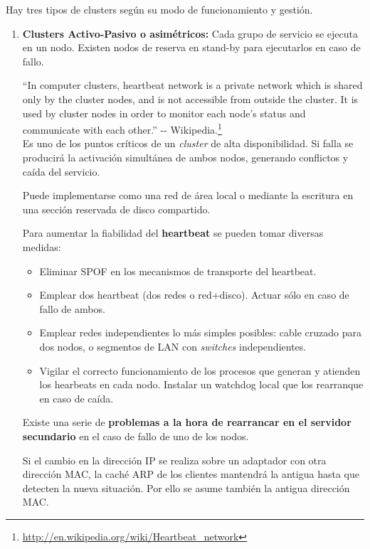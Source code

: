 Hay tres tipos de clusters según su modo de funcionamiento y gestión.
\begin{enumerate}
\item[1] \textbf{Clusters Activo-Pasivo o asimétricos:} Cada grupo de servicio se ejecuta en un nodo. Existen nodos de reserva en stand-by para ejecutarlos en caso de fallo.

\begin{defn}[Heartbeat]
``In computer clusters, heartbeat network is a private network which is shared only by the cluster nodes, and is not accessible from outside the cluster. It is used by cluster nodes in order to monitor each node's status and communicate with each other.'' -{}- Wikipedia.\footnote{\url{http://en.wikipedia.org/wiki/Heartbeat_network}}\\

Es uno de los puntos críticos de un \textit{cluster} de alta disponibilidad. Si falla se producirá la activación simultánea de ambos nodos, generando conflictos y caída del servicio.

Puede implementarse como una red de área local o mediante la escritura en una sección reservada de disco compartido.
\end{defn}

Para aumentar la fiabilidad del \textbf{heartbeat} se pueden tomar diversas medidas:
\begin{itemize}
\item Eliminar SPOF en los mecanismos de transporte del heartbeat.
\item Emplear dos heartbeat (dos redes o red+disco). Actuar sólo en caso de fallo
de ambos.
\item Emplear redes independientes lo más simples posibles: cable cruzado para
dos nodos, o segmentos de LAN con \textit{switches} independientes.
\item Vigilar el correcto funcionamiento de los procesos que generan y atienden los
hearbeats en cada nodo. Instalar un watchdog local que los rearranque en caso de caída.
\end{itemize}

Existe una serie de \textbf{problemas a la hora de rearrancar en el servidor secundario} en el caso de fallo de uno de los nodos.

Si el cambio en la dirección IP se realiza sobre un adaptador con otra dirección MAC, la caché ARP de los clientes mantendrá la antigua hasta que detecten la nueva situación. Por ello se asume también la antigua dirección MAC.


\end{enumerate}
